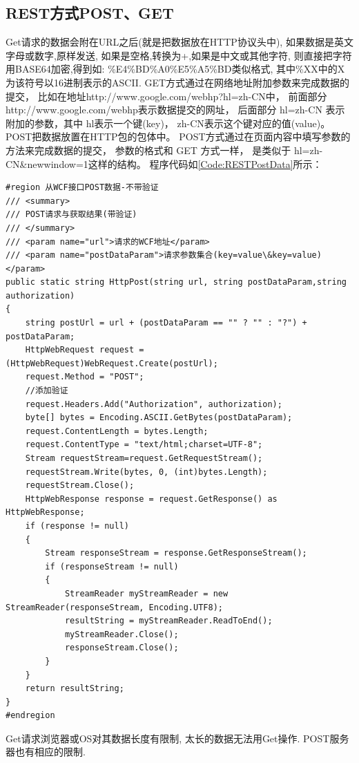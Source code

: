 \documentclass{book}
\begin{document}
\subsection{REST方式POST、GET}

Get请求的数据会附在URL之后(就是把数据放在HTTP协议头中),
如果数据是英文字母或数字,原样发送,
如果是空格,转换为+,如果是中文或其他字符,
则直接把字符用BASE64加密,得到如:
\%E4\%BD\%A0\%E5\%A5\%BD类似格式,
其中\%XX中的X为该符号以16进制表示的ASCII.
GET方式通过在网络地址附加参数来完成数据的提交，
比如在地址http://www.google.com/webhp?hl=zh-CN中，
前面部分http://www.google.com/webhp表示数据提交的网址，
后面部分 hl=zh-CN 表示附加的参数，其中 hl表示一个键(key)， 
zh-CN表示这个键对应的值(value)。POST把数据放置在HTTP包的包体中。
POST方式通过在页面内容中填写参数的方法来完成数据的提交，
参数的格式和 GET 方式一样，
是类似于 hl=zh-CN\&newwindow=1这样的结构。
程序代码如\ref{Code:RESTPostData}所示：

\begin{lstlisting}[language={[Sharp]C},caption=REST方式POST，不带验证,label={Code:RESTPostData}]
#region 从WCF接口POST数据-不带验证
/// <summary>  
/// POST请求与获取结果(带验证)  
/// </summary>  
/// <param name="url">请求的WCF地址</param>
/// <param name="postDataParam">请求参数集合(key=value\&key=value)</param>
public static string HttpPost(string url, string postDataParam,string authorization)
{
    string postUrl = url + (postDataParam == "" ? "" : "?") + postDataParam;
    HttpWebRequest request = (HttpWebRequest)WebRequest.Create(postUrl);
    request.Method = "POST";
    //添加验证
    request.Headers.Add("Authorization", authorization);
    byte[] bytes = Encoding.ASCII.GetBytes(postDataParam);
    request.ContentLength = bytes.Length;
    request.ContentType = "text/html;charset=UTF-8";
    Stream requestStream=request.GetRequestStream();
    requestStream.Write(bytes, 0, (int)bytes.Length);
    requestStream.Close();
    HttpWebResponse response = request.GetResponse() as HttpWebResponse;
    if (response != null)
    {
        Stream responseStream = response.GetResponseStream();
        if (responseStream != null)
        {
            StreamReader myStreamReader = new StreamReader(responseStream, Encoding.UTF8);
            resultString = myStreamReader.ReadToEnd();
            myStreamReader.Close();
            responseStream.Close();
        }
    }
    return resultString;
}
#endregion
\end{lstlisting}

Get请求浏览器或OS对其数据长度有限制,
太长的数据无法用Get操作.
POST服务器也有相应的限制.
\end{document}
